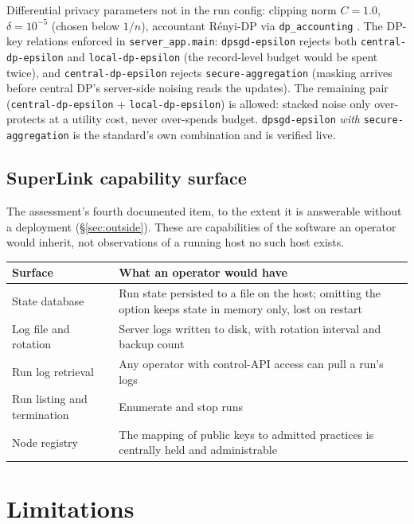 Differential privacy parameters not in the run config: clipping norm $C = 1.0$, $\delta = 10^{-5}$
(chosen below $1/n$), accountant R\'enyi-DP via \texttt{dp\_accounting} \cite{dpaccounting}. The
DP-key relations enforced in \texttt{server\_app.main}: \texttt{dpsgd-epsilon} rejects
both \texttt{central-dp-epsilon} and \texttt{local-dp-epsilon} (the record-level budget would be
spent twice), and \texttt{central-dp-epsilon} rejects \texttt{secure-aggregation} (masking arrives
before central DP's server-side noising reads the updates). The remaining pair
(\texttt{central-dp-epsilon} + \texttt{local-dp-epsilon}) is allowed: stacked noise only
over-protects at a utility cost, never over-spends budget. \texttt{dpsgd-epsilon} \emph{with}
\texttt{secure-aggregation} is the standard's own combination and is verified live.

\subsection{SuperLink capability surface}

The assessment's fourth documented item, to the extent it is answerable without a deployment
(\S\ref{sec:outside}). These are capabilities of the software an operator would inherit, not
observations of a running host no such host exists.

\begin{center}
\small
\begin{tabular}{lp{7.2cm}}
  \toprule
  Surface & What an operator would have \\
  \midrule
  State database & Run state persisted to a file on the host; omitting the option keeps state in
                   memory only, lost on restart \\
  Log file and rotation & Server logs written to disk, with rotation interval and backup count \\
  Run log retrieval & Any operator with control-API access can pull a run's logs \\
  Run listing and termination & Enumerate and stop runs \\
  Node registry & The mapping of public keys to admitted practices is centrally held and
                  administrable \\
  \bottomrule
\end{tabular}
\end{center}

\section{Limitations}
\label{sec:limits}

